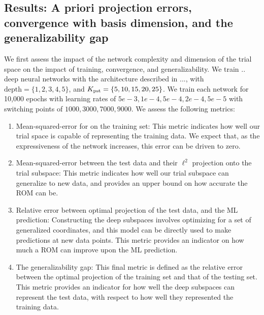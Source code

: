 \documentclass[3p,computermodern,10pt]{elsarticle}
\begin{document}
\subsection{Results: A priori projection errors, convergence with basis dimension, and the generalizability gap}
We first assess the impact of the network complexity and dimension of the trial space on the impact of training, convergence, and generalizability. We train .. deep neural networks with the architecture described in ..., with $\text{depth} = \{1,2,3,4,5\}$, and $K_{\text{pst}} = \{5,10,15,20,25\}$. We train each network for 10,000 epochs with learning rates of $5e-3,1e-4,5e-4,2e-4,5e-5$ with switching points of $1000,3000,7000,9000$. We assess the following metrics:
\begin{enumerate}
\item Mean-squared-error for on the training set: This metric indicates how well our trial space is capable of representing the training data. We expect that, as the expressiveness of the network increases, this error can be driven to zero.

\item Mean-squared-error between the test data and their $\ell^2$ projection onto the trial subspace: This metric indicates how well our trial subspace can generalize to new data, and provides an upper bound on how accurate the ROM can be.

\item Relative error between optimal projection of the test data, and the ML prediction: Constructing the deep subspaces involves optimizing for a set of generalized coordinates, and this model can be directly used to make predictions at new data points. This metric provides an indicator on how much a ROM can improve upon the ML prediction.

\item The generalizability gap: This final metric is defined as the relative error between the optimal projection of the training set and that of the testing set. This metric provides an indicator for how well the deep subspaces can represent the test data, with respect to how well they represented the training data.  
\end{enumerate}
\end{document}
